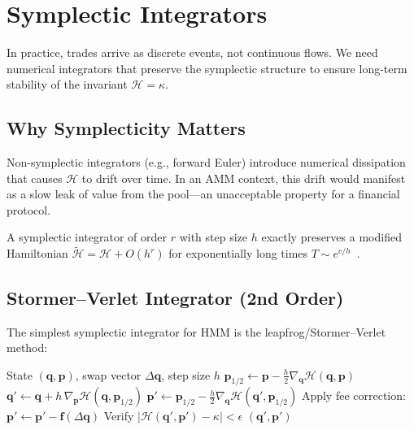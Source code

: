 \section{Symplectic Integrators}

\label{sec:integrators}

In practice, trades arrive as discrete events, not continuous flows. We need numerical integrators that preserve the symplectic structure to ensure long-term stability of the invariant $\mathcal{H} = \kappa$.

\subsection{Why Symplecticity Matters}

Non-symplectic integrators (e.g., forward Euler) introduce numerical dissipation that causes $\mathcal{H}$ to drift over time. In an AMM context, this drift would manifest as a slow leak of value from the pool---an unacceptable property for a financial protocol.

\begin{theorem}
A symplectic integrator of order $r$ with step size $h$ exactly preserves a modified Hamiltonian $\tilde{\mathcal{H}} = \mathcal{H} + O(h^r)$ for exponentially long times $T \sim e^{c/h}$~\cite{hairer2006geometric}.
\end{theorem}

\subsection{Stormer--Verlet Integrator (2nd Order)}

The simplest symplectic integrator for HMM is the leapfrog/Stormer--Verlet method:

\begin{algorithm}[H]
\caption{Stormer--Verlet Swap Execution}
\label{alg:verlet}
\begin{algorithmic}[1]
\Require State $(\bm{q}, \bm{p})$, swap vector $\Delta\bm{q}$, step size $h$
\State $\bm{p}_{1/2} \gets \bm{p} - \frac{h}{2} \nabla_{\bm{q}} \mathcal{H}(\bm{q}, \bm{p})$
\State $\bm{q}' \gets \bm{q} + h \, \nabla_{\bm{p}} \mathcal{H}(\bm{q}, \bm{p}_{1/2})$
\State $\bm{p}' \gets \bm{p}_{1/2} - \frac{h}{2} \nabla_{\bm{q}} \mathcal{H}(\bm{q}', \bm{p}_{1/2})$
\State Apply fee correction: $\bm{p}' \gets \bm{p}' - \bm{f}(\Delta\bm{q})$
\State Verify $|\mathcal{H}(\bm{q}', \bm{p}') - \kappa| < \epsilon$
\State \Return $(\bm{q}', \bm{p}')$
\end{algorithmic}
\end{algorithm}

